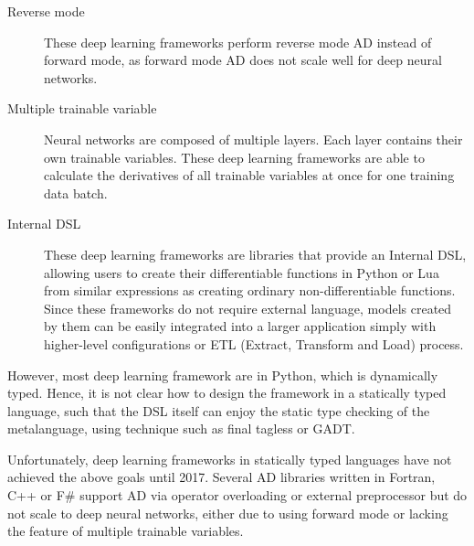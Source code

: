 \begin{description}

  \item[Reverse mode] These deep learning frameworks perform reverse mode AD instead of forward mode, as forward mode AD does not scale well for deep neural networks.

  \item[Multiple trainable variable] Neural networks are composed of multiple layers. Each layer contains their own trainable variables. These deep learning frameworks are able to calculate the derivatives of all trainable variables at once for one training data batch.

  \item[Internal DSL \cite{fowler2010domain}] These deep learning frameworks are libraries that provide an Internal DSL, allowing users to create their differentiable functions in Python or Lua from similar expressions as creating ordinary non-differentiable functions. Since these frameworks do not require external language, models created by them can be easily integrated into a larger application simply with higher-level configurations \cite{chollet2015keras} or ETL (Extract, Transform and Load) process.



\end{description}

However, most deep learning framework are in Python, which is dynamically typed.
Hence, it is not clear how to design the framework in a statically typed language, such that the DSL itself can enjoy the static type checking of the metalanguage, using technique such as final tagless or GADT.

Unfortunately, deep learning frameworks in statically typed languages have not achieved the above goals until 2017.
Several AD libraries \cite{bischof1992adifor,griewank1996algorithm,TapenadeRef13,baydin2015diffsharp} written in Fortran, C++ or F\# support AD via operator overloading or external preprocessor but do not scale to deep neural networks, either due to using forward mode or lacking the feature of multiple trainable variables.

